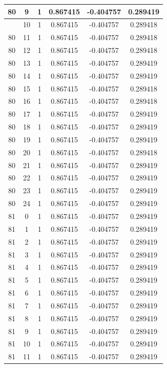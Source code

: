 \documentclass[12pt,a4paper]{article}
\numberwithin{equation}{section}
\numberwithin{figure}{section}
\numberwithin{table}{section}
\begin{document}
\begin{longtable}{|c|c|c|c|c|c|}
80 & 9 & 1 & 0.867415 & -0.404757 & 0.289419 \\ \hline
\pagebreak
80 & 10 & 1 & 0.867415 & -0.404757 & 0.289418 \\ \hline
80 & 11 & 1 & 0.867415 & -0.404757 & 0.289418 \\ \hline
80 & 12 & 1 & 0.867415 & -0.404757 & 0.289418 \\ \hline
80 & 13 & 1 & 0.867415 & -0.404757 & 0.289419 \\ \hline
80 & 14 & 1 & 0.867415 & -0.404757 & 0.289419 \\ \hline
80 & 15 & 1 & 0.867415 & -0.404757 & 0.289418 \\ \hline
80 & 16 & 1 & 0.867415 & -0.404757 & 0.289418 \\ \hline
80 & 17 & 1 & 0.867415 & -0.404757 & 0.289419 \\ \hline
80 & 18 & 1 & 0.867415 & -0.404757 & 0.289419 \\ \hline
80 & 19 & 1 & 0.867415 & -0.404757 & 0.289419 \\ \hline
80 & 20 & 1 & 0.867415 & -0.404757 & 0.289418 \\ \hline
80 & 21 & 1 & 0.867415 & -0.404757 & 0.289419 \\ \hline
80 & 22 & 1 & 0.867415 & -0.404757 & 0.289419 \\ \hline
80 & 23 & 1 & 0.867415 & -0.404757 & 0.289419 \\ \hline
80 & 24 & 1 & 0.867415 & -0.404757 & 0.289419 \\ \hline
81 & 0 & 1 & 0.867415 & -0.404757 & 0.289419 \\ \hline
81 & 1 & 1 & 0.867415 & -0.404757 & 0.289419 \\ \hline
81 & 2 & 1 & 0.867415 & -0.404757 & 0.289419 \\ \hline
81 & 3 & 1 & 0.867415 & -0.404757 & 0.289419 \\ \hline
81 & 4 & 1 & 0.867415 & -0.404757 & 0.289419 \\ \hline
81 & 5 & 1 & 0.867415 & -0.404757 & 0.289419 \\ \hline
81 & 6 & 1 & 0.867415 & -0.404757 & 0.289419 \\ \hline
81 & 7 & 1 & 0.867415 & -0.404757 & 0.289419 \\ \hline
81 & 8 & 1 & 0.867415 & -0.404757 & 0.289419 \\ \hline
81 & 9 & 1 & 0.867415 & -0.404757 & 0.289419 \\ \hline
81 & 10 & 1 & 0.867415 & -0.404757 & 0.289419 \\ \hline
81 & 11 & 1 & 0.867415 & -0.404757 & 0.289419 \\ \hline

\end{longtable}
\end{document}
